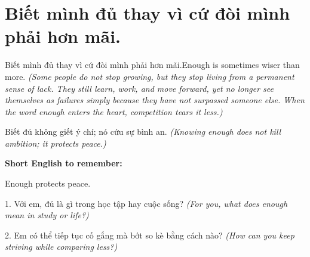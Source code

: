 \section{Biết mình đủ thay vì cứ đòi mình phải hơn mãi.}
\begin{truyen}{Biết mình đủ thay vì cứ đòi mình phải hơn mãi.}{Enough is sometimes wiser than more.}
\textit{(Some people do not stop growing, but they stop living from a permanent sense of lack. They still learn, work, and move forward, yet no longer see themselves as failures simply because they have not surpassed someone else. When the word enough enters the heart, competition tears it less.)}
\end{truyen}
\begin{baihoc}
Biết đủ không giết ý chí; nó cứu sự bình an.
\textit{(Knowing enough does not kill ambition; it protects peace.)}
\end{baihoc}
\begin{ghinhoanh}
\textbf{Short English to remember:}

Enough protects peace.
\end{ghinhoanh}
\begin{tuhocnhanh}
1. Với em, đủ là gì trong học tập hay cuộc sống? \textit{(For you, what does enough mean in study or life?)}

2. Em có thể tiếp tục cố gắng mà bớt so kè bằng cách nào? \textit{(How can you keep striving while comparing less?)}
\end{tuhocnhanh}
\ngancach
